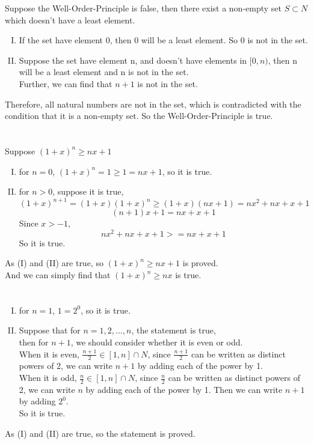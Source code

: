 \documentclass{article}
\begin{document}
Suppose the Well-Order-Principle is false, then there exist a non-empty set $S\subset N$ which doesn't have a least element.
\begin{enumerate}[(I)]
\item
If the set have element 0, then 0 will be a least element. So 0 is not in the set.
\item
Suppose the set have element n, and doesn't have elements in $[0,n)$, then n will be a least element and n is not in the set.\\
Further, we can find that $n+1$ is not in the set.\\
\end{enumerate}
Therefore, all natural numbers are not in the set, which is contradicted with the condition that it is a non-empty set. So the Well-Order-Principle is true.

\section{}
Suppose $(1+x)^n\geqslant nx+1$
\begin{enumerate}[(I)]
\item
for $n=0$, $(1+x)^n=1\geqslant 1=nx+1$, so it is true.
\item
for $n>0$, suppose it is true,
$$(1+x)^{n+1}=(1+x)(1+x)^n\geqslant(1+x)(nx+1)=nx^2+nx+x+1$$
$$(n+1)x+1=nx+x+1$$
Since $x>-1$,
$$nx^2+nx+x+1>=nx+x+1$$
So it is true.
\end{enumerate}
As (I) and (II) are true, so $(1+x)^n\geqslant nx+1$ is proved.\\
And we can simply find that $(1+x)^n\geqslant nx$ is true.

\section{}
\begin{enumerate}[(I)]
\item
for $n=1$, $1=2^0$, so it is true.
\item
Suppose that for $n=1,2,...,n$, the statement is true,\\
then for $n+1$, we should consider whether it is even or odd.\\
When it is even, $\frac{n+1}{2}\in[1,n]\cap N$, since $\frac{n+1}{2}$ can be written as distinct powers of 2, we can write $n+1$ by adding each of the power by 1.\\
When it is odd, $\frac{n}{2}\in[1,n]\cap N$, since $\frac{n}{2}$ can be written as distinct powers of 2, we can write $n$ by adding each of the power by 1. Then we can write $n+1$ by adding $2^0$.\\
So it is true.
\end{enumerate}
As (I) and (II) are true, so the statement is proved.
\end{document}
